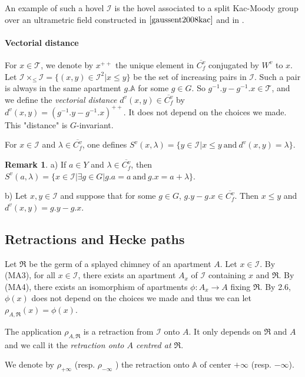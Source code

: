 \documentclass[12pt]{article}
\theoremstyle{plain}
\theoremstyle{definition}
\newtheorem{rque}[thm]{Remark}
\newcommand{\A}{\mathbb{A}}
\newcommand{\I}{\mathcal{I}}
\begin{document}
An example of such a hovel $\I$ is the hovel associated to a split Kac-Moody group over an ultrametric field constructed in $\cite{gaussent2008kac}$ and in \cite{rousseau2012almost}.

\paragraph{Vectorial distance}
For $x\in \mathcal{T}$, we denote by $x^{++}$ the unique element in $\overline{C^v_f}$ conjugated by $W^v$ to $x$. Let $\I\times_{\leq}\I=\{(x,y)\in \I^2|x\leq y\}$ be the set of increasing pairs in $\I$. Such a pair is always in the same apartment $g.\A$ for some $g\in G$. So $g^{-1}.y-g^{-1}.x\in \mathcal{T}$, and we define the \textit{vectorial distance} $d^v(x,y)\in\overline{C_f^v}$ by $d^v(x,y)=(g^{-1}.y-g^{-1}.x)^{++}$. It does not depend on the choices we made. This "distance" is $G$-invariant.

For $x\in \I$ and $\lambda\in \overline{C_f^v}$, one defines $S^v(x,\lambda)=\{y\in \I|x\leq y\mathrm{\ and\ }d^v(x,y)=\lambda\}$.

\begin{rque}\label{rque caractérisation distance vectorielle}
a) If $a\in Y$ and $\lambda\in \overline{C_f^v}$, then $S^v(a,\lambda)=\{x\in \I|\exists g\in G|g.a=a\mathrm{\ and\ }g.x=a+\lambda\}$.

b) Let $x,y\in \I$ and suppose that for some $g\in G$, $g.y-g.x\in \overline{C_f^v}$. Then $x\leq y$ and $d^v(x,y)=g.y-g.x$.
\end{rque}

\subsection{Retractions and Hecke paths}


Let  $\mathfrak{R}$ be the germ of a splayed chimney of an apartment $A$. Let $x\in \I$. By (MA3), for all $x\in \I$, there exists an apartment $A_x$ of $\I$ containing $x$ and $\mathfrak{R}$. By (MA4), there exists an isomorphism of apartments $\phi:A_x\rightarrow A$ fixing $\mathfrak{R}$. By \cite{rousseau2011masures} 2.6, $\phi(x)$ does not depend on the choices we made and thus we can let $\rho_{A,\mathfrak{R}}(x)=\phi(x)$.

The application $\rho_{A,\mathfrak{R}}$ is a retraction from $\I$ onto $A$. It only depends on $\mathfrak{R}$ and $A$ and we call it the \textit{retraction onto $A$ centred at $\mathfrak{R}$}. 

We denote by $\rho_{+\infty}$ (resp. $\rho_{-\infty}$ ) the retraction onto $\A$ of center $+\infty$ (resp. $-\infty$).
\end{document}
